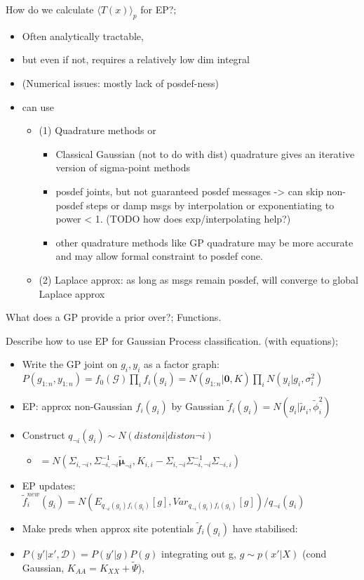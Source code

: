 \documentclass{article}
\begin{document}
How do we calculate $\langle T(x) \rangle_p$ for EP?; \begin{itemize} \item Often analytically tractable,  \item but even if not, requires a relatively low dim integral  \item (Numerical issues: mostly lack of posdef-ness) \item can use \begin{itemize} \item (1) Quadrature methods or  \begin{itemize} \item Classical Gaussian (not to do with dist) quadrature gives an iterative version of sigma-point methods \item posdef joints, but not guaranteed posdef messages -> can skip non-posdef steps or damp msgs by interpolation or exponentiating to power < 1. (TODO how does exp/interpolating help?) \item other quadrature methods like GP quadrature may be more accurate and  may allow formal constraint to posdef cone. \end{itemize} \item (2) Laplace approx: as long as msgs remain posdef, will converge to global Laplace approx \end{itemize} \end{itemize}

What does a GP provide a prior over?; Functions.

Describe how to use EP for Gaussian Process classification. (with equations); \begin{itemize} \item Write the GP joint on $g_i, y_i$ as a factor graph: $P(g_{1:n}, y_{1:n}) = f_0(\mathcal{G})\prod_i f_i(g_i) = N(g_{1:n}|\mathbf{0}, K) \prod_i N(y_i|g_i, \sigma^2_i)$ \item EP: approx non-Gaussian $f_i(g_i)$ by Gaussian $\tilde{f}_i(g_i) = N(g_i | \tilde{\mu}_i, \tilde{\phi}^2_i)$ \item Construct $q_{\neg i}(g_i) \sim N(dist on i | dist on \neg i)$ \begin{itemize} \item $= N(\Sigma_{i, \neg i}, \Sigma_{\neg i, \neg i}^{-1}\tilde{\bm{\mu}}_{\neg i}, K_{i, i} - \Sigma_{i, \neg i}\Sigma_{\neg i, \neg i}^{-1}\Sigma_{\neg i, i})$ \end{itemize} \item EP updates: $\tilde{f}_i^{new}(g_i) = N(E_{q_{\neg i}(g_i)f_i(g_i)}[g], Var_{q_{\neg i}(g_i)f_i(g_i)}[g])/q_{\neg i}(g_i)$ \item Make preds when approx site potentials $\tilde{f}_i(g_i)$ have stabilised:  \item $P(y'|x', \mathcal{D}) = P(y'|g)P(g)$ integrating out g, $g\sim p(x'|X)$ (cond Gaussian, $K_{AA} = K_{XX} + \tilde{\Psi}$),   \end{itemize}
\end{document}
